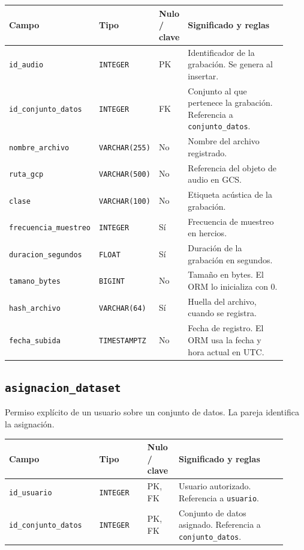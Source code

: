 \noindent
\begin{tabular}{@{}p{0.30\linewidth}p{0.16\linewidth}p{0.10\linewidth}p{0.36\linewidth}@{}}
\hline
\textbf{Campo} & \textbf{Tipo} & \textbf{Nulo / clave} & \textbf{Significado y reglas} \\
\hline
\texttt{id\_\allowbreak{}audio} & \texttt{INTEGER} & PK & Identificador de la grabación. Se genera al insertar. \\
\texttt{id\_\allowbreak{}conjunto\_\allowbreak{}datos} & \texttt{INTEGER} & FK & Conjunto al que pertenece la grabación. Referencia a \texttt{conjunto\_\allowbreak{}datos}. \\
\texttt{nombre\_\allowbreak{}archivo} & \texttt{VARCHAR(255)} & No & Nombre del archivo registrado. \\
\texttt{ruta\_\allowbreak{}gcp} & \texttt{VARCHAR(500)} & No & Referencia del objeto de audio en GCS. \\
\texttt{clase} & \texttt{VARCHAR(100)} & No & Etiqueta acústica de la grabación. \\
\texttt{frecuencia\_\allowbreak{}muestreo} & \texttt{INTEGER} & Sí & Frecuencia de muestreo en hercios. \\
\texttt{duracion\_\allowbreak{}segundos} & \texttt{FLOAT} & Sí & Duración de la grabación en segundos. \\
\texttt{tamano\_\allowbreak{}bytes} & \texttt{BIGINT} & No & Tamaño en bytes. El ORM lo inicializa con 0. \\
\texttt{hash\_\allowbreak{}archivo} & \texttt{VARCHAR(64)} & Sí & Huella del archivo, cuando se registra. \\
\texttt{fecha\_\allowbreak{}subida} & \texttt{TIMESTAMPTZ} & No & Fecha de registro. El ORM usa la fecha y hora actual en UTC. \\
\hline
\end{tabular}

\subsection*{\texttt{asignacion\_\allowbreak{}dataset}}

Permiso explícito de un usuario sobre un conjunto de datos. La pareja identifica la asignación.

\noindent
\begin{tabular}{@{}p{0.30\linewidth}p{0.16\linewidth}p{0.10\linewidth}p{0.36\linewidth}@{}}
\hline
\textbf{Campo} & \textbf{Tipo} & \textbf{Nulo / clave} & \textbf{Significado y reglas} \\
\hline
\texttt{id\_\allowbreak{}usuario} & \texttt{INTEGER} & PK, FK & Usuario autorizado. Referencia a \texttt{usuario}. \\
\texttt{id\_\allowbreak{}conjunto\_\allowbreak{}datos} & \texttt{INTEGER} & PK, FK & Conjunto de datos asignado. Referencia a \texttt{conjunto\_\allowbreak{}datos}. \\
\hline
\end{tabular}

